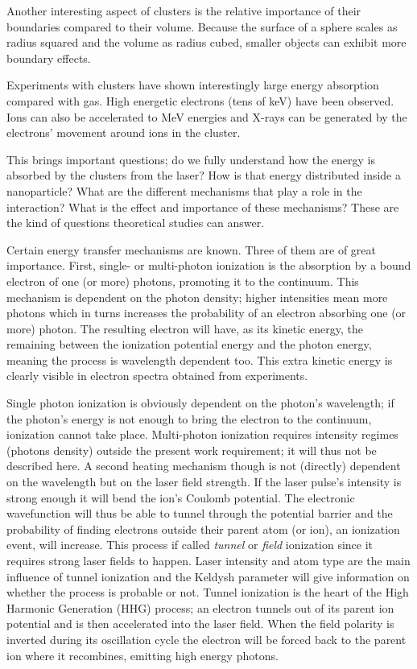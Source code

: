Another interesting aspect of clusters is the relative importance of
their boundaries compared to their volume. Because the surface of a sphere
scales as radius squared and the volume as radius cubed, smaller objects can
exhibit more boundary effects.

Experiments with clusters have shown interestingly large energy absorption
compared with gas\cite{Wabnitz2002,Bostedt2010}. High energetic electrons (tens
of keV) have been observed.
Ions can also be accelerated to MeV energies and X-rays can be generated by the
electrons' movement around ions in the cluster\cite{Ramunno2008}.

This brings important questions; do we fully understand how the energy is
absorbed by the clusters from the laser? How is that energy distributed
inside a nanoparticle? What are the different mechanisms that play a role in
the interaction? What is the effect and importance of these mechanisms? These
are the kind of questions theoretical studies can answer.

Certain energy transfer mechanisms are known. Three of them are of great
importance.
First, single- or multi-photon ionization is the absorption by a bound electron
of one (or more) photons, promoting it to the continuum. This
mechanism is dependent on the photon density; higher intensities mean more
photons which in turns increases the probability of an electron absorbing one
(or more) photon. The resulting electron will have, as its kinetic energy, the
remaining between the ionization potential energy and the photon energy,
meaning the process is wavelength dependent too. This
extra kinetic energy is clearly visible in electron spectra obtained from
experiments\citeneeded.

Single photon ionization is obviously dependent on the photon's wavelength; if
the photon's energy is not enough to bring the electron to the continuum,
ionization cannot take place. Multi-photon ionization requires intensity
regimes (photons density) outside the present work requirement; it will thus
not be described
here. A second heating  mechanism though is not
(directly) dependent on the wavelength but on the laser field strength. If the
laser pulse's intensity is strong enough it will bend the ion's Coulomb
potential. The electronic wavefunction will thus be able to tunnel
through the potential barrier and the probability of finding electrons
outside their parent atom (or ion), an ionization event, will increase. This
process if called \textit{tunnel} or \textit{field} ionization  since it
requires strong laser fields to happen. Laser intensity and atom type are the
main influence of tunnel ionization and the Keldysh parameter will give
information on whether the process is probable or not. Tunnel ionization is the
heart of the High Harmonic Generation (HHG) process; an electron tunnels out of
its parent ion potential and is then accelerated into the laser
field. When the field polarity is inverted during its oscillation cycle the
electron will be forced back to the parent ion where it recombines, emitting
high energy photons\citeneeded.


